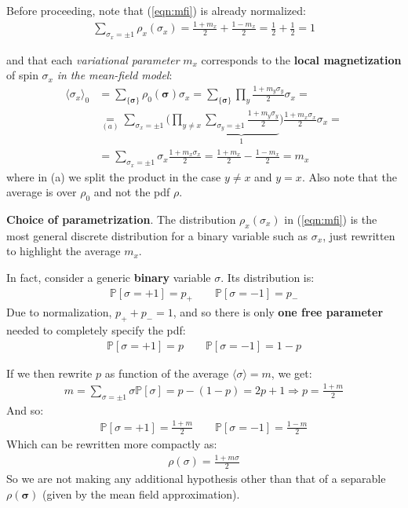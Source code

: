 \documentclass[../../main.tex]{subfiles}
\begin{document}
Before proceeding, note that (\ref{eqn:mfi}) is already normalized:
\begin{align*}
    \sum_{\sigma_x = \pm 1}\rho_x(\sigma_x) = \frac{1+m_x}{2} + \frac{1-m_x}{2} = \frac{1}{2} + \frac{1}{2} = 1    
\end{align*}

and that each \textit{variational parameter} $m_x$ corresponds to the \textbf{local magnetization} of spin $\sigma_x$ \textit{in the mean-field model}: 
\begin{align}\nonumber
    \langle \sigma_x \rangle_0 &= \sum_{\{\bm{\sigma}\}} \rho_0(\bm{\sigma}) \sigma_x = \sum_{\{\bm{\sigma}\}} \prod_y \frac{1+m_y \sigma_y}{2} \sigma_x =  \\ \nonumber
    &\underset{(a)}{=}  \sum_{\sigma_x = \pm 1} \Bigg(\prod_{y \neq x} \underbrace{\sum_{\sigma_y = \pm 1} \frac{1+m_y \sigma_y}{2}}_{1} \Bigg) \frac{1+m_x \sigma_x}{2} \sigma_x =\\ 
    &=
    \sum_{\sigma_x = \pm 1} \sigma_x \frac{1+m_x \sigma_x}{2} = \frac{1+m_x}{2} - \frac{1-m_x}{2} =  m_x \label{eqn:local-average}
\end{align}
where in (a) we split the product in the case $y \neq x$ and $y = x$. Also note that the average is over $\rho_0$ and not the  pdf $\rho$.

\begin{expl}\textbf{Choice of parametrization}.  
    The distribution $\rho_x(\sigma_x)$ in (\ref{eqn:mfi}) is the most general discrete distribution for a binary variable such as $\sigma_x$, just rewritten to highlight the average $m_x$.

    In fact, consider a generic \textbf{binary} variable $\sigma$. Its distribution is:
    \begin{align*}
        \mathbb{P}[\sigma = +1] = p_+ \qquad \mathbb{P}[\sigma=-1] = p_-
    \end{align*}
    Due to normalization, $p_+ + p_- = 1$, and so there is only \textbf{one free parameter} needed to completely specify the pdf:
    \begin{align*}
        \mathbb{P}[\sigma = +1] = p \qquad \mathbb{P}[\sigma = -1] = 1-p
    \end{align*}  
    
    If we then rewrite $p$ as function of the average $\langle \sigma \rangle = m$, we get:
    \begin{align*}
        m = \sum_{\sigma = \pm 1} \sigma\mathbb{P}[\sigma] = p - (1-p) = 2p + 1 \Rightarrow p = \frac{1+m}{2} 
    \end{align*}
    And so:
    \begin{align*}
        \mathbb{P}[\sigma = +1] = \frac{1+m}{2} \qquad \mathbb{P}[\sigma = -1] = \frac{1-m}{2}  
    \end{align*}
    Which can be rewritten more compactly as:
    \begin{align*}
        \rho(\sigma) = \frac{1+m \sigma}{2} 
    \end{align*}
    So we are not making any additional hypothesis other than that of a separable $\rho(\bm{\sigma})$ (given by the mean field approximation).
\end{expl}
\end{document}
